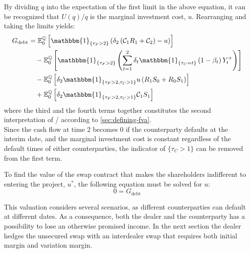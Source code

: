 \documentclass[main.tex]{subfiles}
\begin{document}
        By dividing $q$ into the expectation of the first limit in the above equation, it can be recognized that $U(q)/q$ is the marginal investment cost, $u$.
        Rearranging and taking the limits yields:
        \begin{align}
            G_{\text{debt}} &= 
            \mathbb{E}_{0}^{\rnmeasure}\left[
                \mathbbm{1}_{\{\tau_{F}>2\}}
                \left(
                    \delta_{2} \left(\mathcal{C}_{1} R_{1} + \mathcal{C}_{2}\right) - u
                \right)
            \right]
            \nonumber
            \\
            &\quad-
            \mathbb{E}_{0}^{\rnmeasure}\left[
                \mathbbm{1}_{\{\tau_{F}>2\}}
                \left(
                    \sum_{t=1}^{2} \delta_{t} \mathbbm{1}_{\{\tau_{C}=t\}}\left(1-\beta_t\right)Y_{t}^{+}
                \right)
            \right]
            \nonumber
            \\
            &\quad-
            \mathbb{E}_{0}^{\rnmeasure}\left[
                \delta_2 \mathbbm{1}_{\{\tau_{F}>2,\tau_{C}>1\}} u \left(
                    R_{1} S_{0} + R_{0} S_{1}
                \right)
            \right]
            \nonumber
            \\
            &\quad+
            \mathbb{E}_{0}^{\rnmeasure}\left[
                \delta_2 \mathbbm{1}_{\{\tau_{F}>2,\tau_{C}>1\}}
                \mathcal{C}_{1} S_1
            \right]
        \end{align}
        where the third and the fourth terms together constitutes the second interpretation of \FVA/ according to \cref{sec:defining-fva}.
        \\
        Since the cash flow at time 2 becomes 0 if the counterparty defaults at the interim date,
        and the marginal investment cost is constant regardless of the default times of either counterparties,
        the indicator of $\{\tau_{C}>1\}$ can be removed from the first term.

        To find the value of the swap contract that makes the shareholders indifferent to entering the project, $u^{\ast}$,
        the following equation must be solved for $u$:
        \begin{equation}
            0 = G_{\text{debt}}
        \end{equation}

        This valuation considers several scenarios, as different counterparties can default at different dates.
        As a consequence, both the dealer and the counterparty has a possibility to lose an otherwise promised income.
        In the next section the dealer hedges the unsecured swap with an interdealer swap that requires both initial margin and variation margin.
\end{document}
